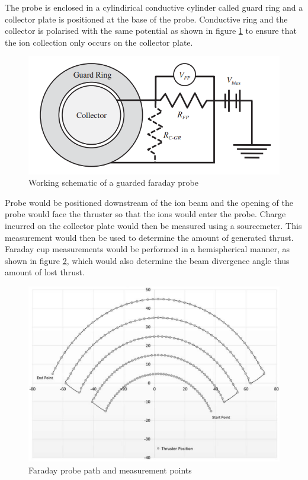 \newpage

The probe is enclosed in a cylindirical conductive cylinder called guard ring and a collector plate is positioned at the base of the probe. Conductive ring and the collector is polarised with the same potential as shown in figure \ref{fig:faradayschematic} to ensure that the ion collection only occurs on the collector plate. 

\begin{figure}[ht]
    \centering
    \includegraphics[scale=0.5]{fig/probeschematic.png}
    \caption[Working schematic of a guarded faraday probe]{Working schematic of a guarded faraday probe\cite{brown2017recommended}}
    \label{fig:faradayschematic}
\end{figure}


Probe would be positioned downstream of the ion beam and the opening of the probe would face the thruster so that the ions would enter the probe. Charge incurred on the collector plate would then be measured using a sourcemeter. This measurement would then be used to determine the amount of generated thrust. Faraday cup measurements would be performed in a hemispherical manner, as shown in figure \ref{fig:probepos}, which would also determine the beam divergence angle thus amount of lost thrust.

\begin{figure}[ht]
    \centering
    \includegraphics[scale=0.5]{fig/probepos.png}
    \caption[Faraday probe path and measurement points]{Faraday probe path and measurement points\cite{Couch2017}}
    \label{fig:probepos}
\end{figure}
\newpage

